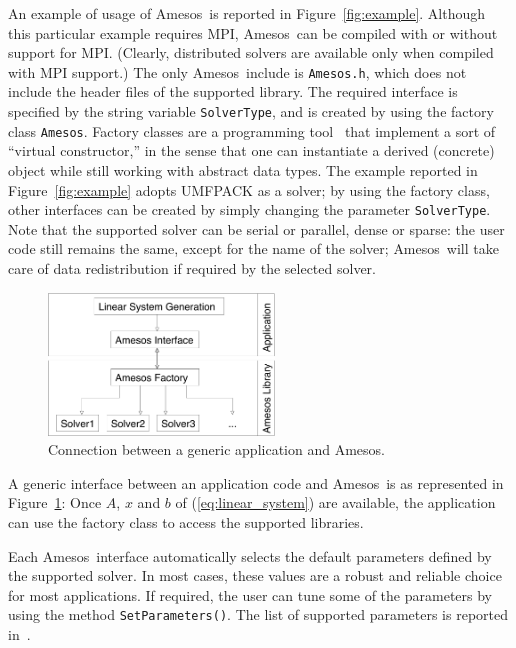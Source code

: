 \documentclass[acmtocl]{acmtrans2m}
\newcommand{\amesos}{{\sc Amesos}}
\begin{document}
An example of usage of \amesos\ is reported in Figure~\ref{fig:example}. 
Although this particular example requires MPI, \amesos\
can be compiled with or without support for MPI. (Clearly, distributed
solvers are available only when compiled with MPI support.) The only
\amesos\ include is \verb!Amesos.h!, which does not include the header files of
the supported library. The required interface is specified by the string
variable \verb!SolverType!, and is created by using the
factory class \verb!Amesos!. Factory classes are a programming
tool~\cite{alexandrescu01modern} that implement a sort of ``virtual
constructor,'' in the sense that one can instantiate a derived (concrete) object
while still working with abstract data types. 
The example reported in Figure~\ref{fig:example} adopts UMFPACK as a solver; 
by using the factory class, other
interfaces can be created by simply changing the parameter
{\tt SolverType}. Note that the supported solver can be serial or parallel,
  dense or sparse: the user code still remains the same, except for the name
  of the solver;
  \amesos\ will take care of data redistribution if required by the selected
  solver. 

\begin{figure}
\begin{center}
\includegraphics[width=6cm]{amesos_and_application.pdf}
\end{center}
\caption{Connection between a generic application and \amesos.}
\label{fig:app}
\end{figure}

A generic interface between an application code and \amesos\ is as represented
in Figure~\ref{fig:app}: Once $A$, $x$ and $b$ of (\ref{eq:linear_system}) are
available, the application can use the factory class to access the supported
libraries.

Each \amesos\ interface automatically selects the default parameters defined by
the supported solver. In most cases, these values are a robust and reliable
choice for most applications. If required, the user can tune some of the
parameters by using the method \verb!SetParameters()!. The list of supported
parameters is reported in~\cite{Amesos-Reference-Guide}.
\end{document}
